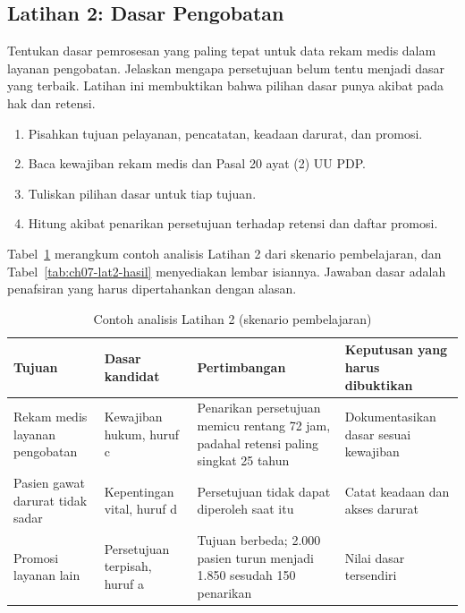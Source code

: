 \subsection*{Latihan 2: Dasar Pengobatan}

Tentukan dasar pemrosesan yang paling tepat untuk data rekam medis dalam layanan pengobatan.
Jelaskan mengapa persetujuan belum tentu menjadi dasar yang terbaik. Latihan ini membuktikan bahwa
pilihan dasar punya akibat pada hak dan retensi.

\begin{enumerate}
  \item Pisahkan tujuan pelayanan, pencatatan, keadaan darurat, dan promosi.
  \item Baca kewajiban rekam medis dan Pasal 20 ayat (2) UU PDP.
  \item Tuliskan pilihan dasar untuk tiap tujuan.
  \item Hitung akibat penarikan persetujuan terhadap retensi dan daftar promosi.
\end{enumerate}

Tabel~\ref{tab:ch07-lat2-contoh} merangkum contoh analisis Latihan 2 dari skenario pembelajaran, dan
Tabel~\ref{tab:ch07-lat2-hasil} menyediakan lembar isiannya. Jawaban dasar adalah penafsiran yang
harus dipertahankan dengan alasan.

\begin{table}[!htb]
  \centering\small
  \caption{Contoh analisis Latihan 2 (skenario pembelajaran)}\label{tab:ch07-lat2-contoh}
  \begin{tabularx}{\textwidth}{|>{\raggedright\arraybackslash}p{}|>{\raggedright\arraybackslash}X|>{\raggedright\arraybackslash}X|>{\raggedright\arraybackslash}X|}
    \hline
    \textbf{Tujuan} & \textbf{Dasar kandidat} & \textbf{Pertimbangan} & \textbf{Keputusan yang harus
    dibuktikan} \\ \hline
    Rekam medis layanan pengobatan & Kewajiban hukum, huruf c & Penarikan persetujuan memicu rentang
    72 jam, padahal retensi paling singkat 25 tahun & Dokumentasikan dasar sesuai kewajiban \\
    \hline
    Pasien gawat darurat tidak sadar & Kepentingan vital, huruf d & Persetujuan tidak dapat
    diperoleh saat itu & Catat keadaan dan akses darurat \\ \hline
    Promosi layanan lain & Persetujuan terpisah, huruf a & Tujuan berbeda; 2.000 pasien turun
    menjadi 1.850 sesudah 150 penarikan & Nilai dasar tersendiri \\ \hline
  \end{tabularx}
\end{table}

